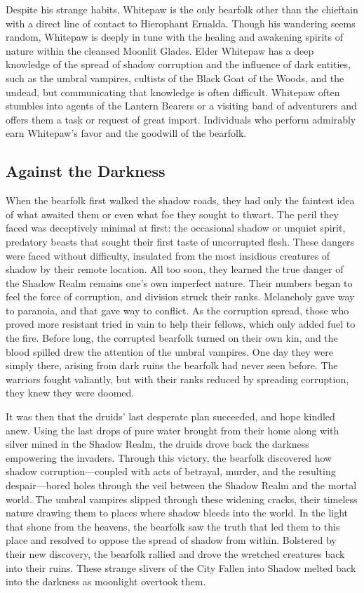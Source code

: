 \documentclass[10pt,a4paper,twoside,bg=print,twocolumn,openany,nodeprecatedcode]{dndbook}
\begin{document}
Despite his strange habits, Whitepaw is the only bearfolk other than the chieftain with a direct line of contact to Hierophant Ernalda. Though his wandering seems random, Whitepaw is deeply in tune with the healing and awakening spirits of nature within the cleansed Moonlit Glades. Elder Whitepaw has a deep knowledge of the spread of shadow corruption and the influence of dark entities, such as the umbral vampires, cultists of the Black Goat of the Woods, and the undead, but communicating that knowledge is often difficult. Whitepaw often stumbles into agents of the Lantern Bearers or a visiting band of adventurers and offers them a task or request of great import. Individuals who perform admirably earn Whitepaw's favor and the goodwill of the bearfolk.

\subsection{Against the Darkness}
When the bearfolk first walked the shadow roads, they had only the faintest idea of what awaited them or even what foe they sought to thwart. The peril they faced was deceptively minimal at first: the occasional shadow or unquiet spirit, predatory beasts that sought their first taste of uncorrupted flesh. These dangers were faced without difficulty, insulated from the most insidious creatures of shadow by their remote location. All too soon, they learned the true danger of the Shadow Realm remains one's own imperfect nature. Their numbers began to feel the force of corruption, and division struck their ranks. Melancholy gave way to paranoia, and that gave way to conflict. As the corruption spread, those who proved more resistant tried in vain to help their fellows, which only added fuel to the fire. Before long, the corrupted bearfolk turned on their own kin, and the blood spilled drew the attention of the umbral vampires. One day they were simply there, arising from dark ruins the bearfolk had never seen before. The warriors fought valiantly, but with their ranks reduced by spreading corruption, they knew they were doomed.

It was then that the druids' last desperate plan succeeded, and hope kindled anew. Using the last drops of pure water brought from their home along with silver mined in the Shadow Realm, the druids drove back the darkness empowering the invaders. Through this victory, the bearfolk discovered how shadow corruption—coupled with acts of betrayal, murder, and the resulting despair—bored holes through the veil between the Shadow Realm and the mortal world. The umbral vampires slipped through these widening cracks, their timeless nature drawing them to places where shadow bleeds into the world. In the light that shone from the heavens, the bearfolk saw the truth that led them to this place and resolved to oppose the spread of shadow from within. Bolstered by their new discovery, the bearfolk rallied and drove the wretched creatures back into their ruins. These strange slivers of the City Fallen into Shadow melted back into the darkness as moonlight overtook them.
\end{document}
